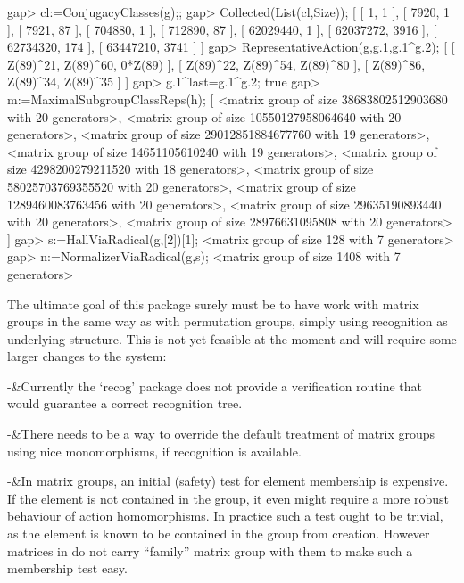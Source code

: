 \beginexample
gap> cl:=ConjugacyClasses(g);;
gap> Collected(List(cl,Size));
[ [ 1, 1 ], [ 7920, 1 ], [ 7921, 87 ], [ 704880, 1 ], [ 712890, 87 ], 
  [ 62029440, 1 ], [ 62037272, 3916 ], [ 62734320, 174 ], [ 63447210, 3741 ] ]
gap> RepresentativeAction(g,g.1,g.1^g.2);               
[ [ Z(89)^21, Z(89)^60, 0*Z(89) ], [ Z(89)^22, Z(89)^54, Z(89)^80 ], 
  [ Z(89)^86, Z(89)^34, Z(89)^35 ] ]
gap> g.1^last=g.1^g.2; 
true
gap> m:=MaximalSubgroupClassReps(h);
[ <matrix group of size 38683802512903680 with 20 generators>, 
  <matrix group of size 10550127958064640 with 20 generators>, 
  <matrix group of size 29012851884677760 with 19 generators>, 
  <matrix group of size 14651105610240 with 19 generators>, 
  <matrix group of size 4298200279211520 with 18 generators>, 
  <matrix group of size 58025703769355520 with 20 generators>, 
  <matrix group of size 1289460083763456 with 20 generators>, 
  <matrix group of size 29635190893440 with 20 generators>, 
  <matrix group of size 28976631095808 with 20 generators> ]
gap> s:=HallViaRadical(g,[2])[1];
<matrix group of size 128 with 7 generators>
gap> n:=NormalizerViaRadical(g,s);
<matrix group of size 1408 with 7 generators>
\endexample


The ultimate goal of this package surely must be to have {\GAP} work with
matrix groups in the same way as with permutation groups, simply using
recognition as underlying structure. This is not yet feasible at the moment
and will require some larger changes to the system:

\beginitems
-&Currently the `recog' package does not provide a verification routine that
would guarantee a correct recognition tree.

-&There needs to be a way to override the default treatment of matrix groups
using nice monomorphisms, if recognition is available.

-&In matrix groups, an initial (safety) test for element membership is
expensive. If the element is not contained in the group, it even might
require a more robust behaviour of action homomorphisms.
In practice such a test ought to be trivial, as the element is known to be
contained in the group from creation. However matrices in {\GAP} do not
carry ``family'' matrix group with them to make such a membership test easy.
\enditems


